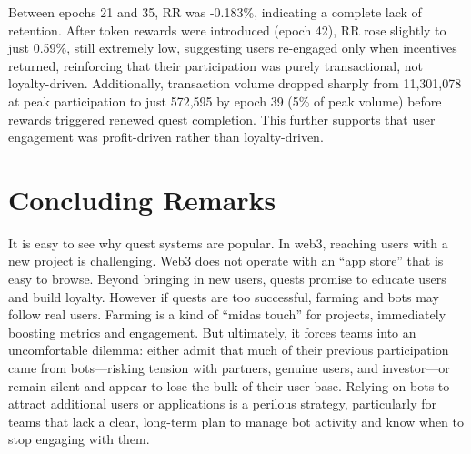 Between epochs 21 and 35, RR was -0.183\%, indicating a complete lack of retention. After token rewards were introduced (epoch 42), RR rose slightly to just 0.59\%, still extremely low, suggesting users re-engaged only when incentives returned, reinforcing that their participation was purely transactional, not loyalty-driven.
Additionally, transaction volume dropped sharply from 11,301,078 at peak participation to just 572,595 by epoch 39 (5\% of peak volume) before rewards triggered renewed quest completion. This further supports that user engagement was profit-driven rather than loyalty-driven.


\section{Concluding Remarks}

It is easy to see why quest systems are popular. In web3, reaching users with a new project is challenging. Web3 does not operate with an ``app store'' that is easy to browse. Beyond bringing in new users, quests promise to educate users and build loyalty. However if quests are too successful, farming and bots may follow real users. Farming is a kind of ``midas touch'' for projects, immediately boosting metrics and engagement. But ultimately, it forces teams into an uncomfortable dilemma: either admit that much of their previous participation came from bots---risking tension with partners, genuine users, and investor---or remain silent and appear to lose the bulk of their user base. Relying on bots to attract additional users or applications is a perilous strategy, particularly for teams that lack a clear, long-term plan to manage bot activity and know when to stop engaging with them.

